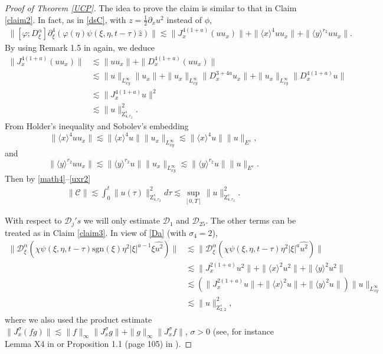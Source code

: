 \documentclass[reqno]{amsart}
\newcommand{\va}{\varphi}
\newcommand{\les}{\lesssim}
\newcommand{\lanx}{\langle x \rangle}
\newcommand{\lany}{\langle y \rangle}
\newcommand{\Dta}{\mathcal{D}^{\alpha}_\xi}
\newcommand{\p}{\partial}
\newcommand{\sgn}{\text{sgn}}
\numberwithin{equation}{section}
\begin{document}
\begin{proof}[Proof of Theorem \ref{UCP}]
The idea to prove the claim is similar to that in Claim \ref{claim2}. In fact, as in \eqref{dsC}, with $z=\frac12 \p_x u^2$ instead of $\phi$,
\begin{equation}
\begin{split}\label{math4}
\|[\va;D_{\xi}^{\alpha}]\p_\xi^4(\va(\eta)\psi(\xi,\eta,t-\tau)\hat{z})\|
\les \|J_x^{4(1+a)}(uu_x)\|+\|\lanx^4 uu_x\|+\|\lany^{r_2}uu_x\|.
\end{split}
\end{equation} 
By using  Remark 1.5 in \cite{dong} again, we deduce
\begin{equation}
\begin{split}\label{4a}
\|J_x^{4(1+a)}(uu_x)\|&\les \|uu_x\|+\|D_x^{4(1+a)}(uu_x)\|\\
&\les \|u\|_{L^\infty_{xy}}\|u_x\|+\|u_x\|_{L^\infty_{xy}}\|D_x^{3+4a}u_x\|+\|u_x\|_{L^\infty_{xy}}\|D_x^{4(1+a)}u\|\\
&\lesssim \|J_x^{4(1+a)} u\|^2\\
&\les  \|u\|_{\mathrm{Z}_{4,r_2}^s }^2.
\end{split}
\end{equation}
From Holder's inequality and Sobolev's embedding 
\begin{equation}\label{ux1}
\|\lanx^4 uu_x\|\les \|\lanx^4 u\|\|u_x\|_{L^\infty_{xy}}\les \|\lanx^4 u\|\|u\|_{E^s},
\end{equation}
and
\begin{equation}\label{uxr2}
\|\lany^{r_2}uu_x\|\les \|\lany^{r_2}u\|\|u_x\|_{L^\infty_{xy}}\les \|\lany^{r_2}u\|\|u\|_{E^s}.
\end{equation}
Then by \eqref{math4}--\eqref{uxr2}
\begin{equation*}
\begin{split}
\|\mathcal C\|\les\int_0^t \|u(\tau)\|_{\mathrm{Z}_{4,r_2}^s }^2 d\tau
 \les \sup_{[0,T]}\|u\|_{\mathrm{Z}_{4,r_2}^s }^2.
 \end{split}
\end{equation*}

With respect to $\mathcal D_j's$ we will only estimate  $\mathcal D_1$ and $\mathcal D_{25}$. The other terms can be treated as in Claim \ref{claim3}.
In view of \eqref{Da} (with $\sigma_4=2$),
\begin{equation*}
\begin{split}\label{D11}
\|\Dta(\chi \psi(\xi,\eta,t-\tau)\sgn(\xi)\eta^2 |\xi|^{a-1}\xi \widehat{u^2})\|&\les \|\Dta(\chi \psi(\xi,\eta,t-\tau)\eta^2 |\xi|^{a} \widehat{u^2})\|\\
&\les \|J_x^{2(1+a)}u^2\|+\|\lanx^2 u^2\|+\|\lany^2 u^2\|\\
&\les(\|J_x^{2(1+a)}u\|+\|\lanx^2 u\|+\|\lany^2 u\|)\|u\|_{L^\infty_{xy}}\\
&\les\|u\|_{\mathrm{Z}_{2,2}^s}^2,
\end{split}
\end{equation*}
where we also used the product estimate $\|J^\sigma_x(fg)\|\les \|f\|_\infty\|J^\sigma_xg\|+\|g\|_\infty\|J^\sigma_xf\|$, $\sigma>0$ (see, for instance Lemma X4 in \cite{KP} or Proposition 1.1 (page 105) in \cite{Taylor}).


\end{proof}
\end{document}
